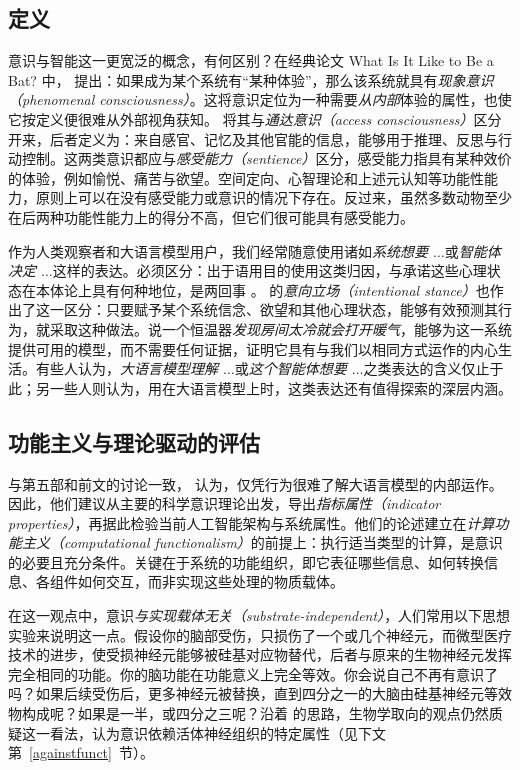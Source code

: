 \subsection{定义}
意识与智能这一更宽泛的概念，有何区别？在经典论文 What Is It Like to Be a Bat? 中，\citet{nagel1974bat} 提出：如果成为某个系统有“某种体验”，那么该系统就具有\emph{现象意识（phenomenal consciousness）}。这将意识定位为一种需要\emph{从内部}体验的属性，也使它按定义便很难从外部视角获知。\citet{block1995confusion} 将其与\emph{通达意识（access consciousness）}区分开来，后者定义为：来自感官、记忆及其他官能的信息，能够用于推理、反思与行动控制。这两类意识都应与\emph{感受能力（sentience）}区分，感受能力指具有某种效价的体验，例如愉悦、痛苦与欲望。空间定向、心智理论和上述元认知等功能性能力，原则上可以在没有感受能力或意识的情况下存在。反过来，虽然多数动物至少在后两种功能性能力上的得分不高，但它们很可能具有感受能力。

作为人类观察者和大语言模型用户，我们经常随意使用诸如\emph{系统想要 $\dots$}或\emph{智能体决定 $\ldots$}这样的表达。必须区分：出于语用目的使用这类归因，与承诺这些心理状态在本体论上具有何种地位，是两回事 \citep{van-dijk-etal-2023-large}。\citet{dennett1987intentional} 的\emph{意向立场（intentional stance）}也作出了这一区分：只要赋予某个系统信念、欲望和其他心理状态，能够有效预测其行为，就采取这种做法。说一个恒温器\emph{发现房间太冷就会打开暖气}，能够为这一系统提供可用的模型，而不需要任何证据，证明它具有与我们以相同方式运作的内心生活。有些人认为，\emph{大语言模型理解 $\ldots$}或\emph{这个智能体想要 $\ldots$}之类表达的含义仅止于此；另一些人则认为，用在大语言模型上时，这类表达还有值得探索的深层内涵。

\subsection{功能主义与理论驱动的评估}
与第五部和前文的讨论一致，\citet{butlin2023consciousness} 认为，仅凭行为很难了解大语言模型的内部运作。因此，他们建议从主要的科学意识理论出发，导出\emph{指标属性（indicator properties）}，再据此检验当前人工智能架构与系统属性。他们的论述建立在\emph{计算功能主义（computational functionalism）}的前提上：执行适当类型的计算，是意识的必要且充分条件。关键在于系统的功能组织，即它表征哪些信息、如何转换信息、各组件如何交互，而非实现这些处理的物质载体。

在这一观点中，意识\emph{与实现载体无关（substrate-independent）}，人们常用以下思想实验来说明这一点。假设你的脑部受伤，只损伤了一个或几个神经元，而微型医疗技术的进步，使受损神经元能够被硅基对应物替代，后者与原来的生物神经元发挥完全相同的功能。你的脑功能在功能意义上完全等效。你会说自己不再有意识了吗？如果后续受伤后，更多神经元被替换，直到四分之一的大脑由硅基神经元等效物构成呢？如果是一半，或四分之三呢？沿着 \citet{searle1980minds} 的思路，生物学取向的观点仍然质疑这一看法，认为意识依赖活体神经组织的特定属性（见下文第~\ref{againstfunct}~节）。

